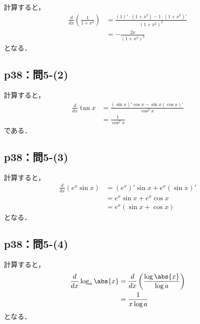 \documentclass[uplatex,dvipdfmx,a4paper,10pt,fleqn]{jsarticle}
\begin{document}
\begin{tleftbar}
    計算すると，
    \begin{align*} 
        \frac{d}{dx} \left ( \frac{1}{1+x^2} \right) & = \frac{(1)' \cdot (1+x^2) - 1 \cdot (1+x^2)'}{(1+x^2)^2} \\
        & = -\frac{2x}{(1+x^2)^2} 
    \end{align*} 
    となる．
\end{tleftbar}


\subsection*{p38：問5-(2)}

\begin{tleftbar}
    計算すると，
    \begin{align*} 
        \frac{d}{dx} \tan x & = \frac{(\sin x)' \cos x - \sin x (\cos x)'}{\cos ^2 x} \\
        & = \frac{1}{\cos ^2 x}
    \end{align*}
        である．
\end{tleftbar}


\subsection*{p38：問5-(3)}

\begin{tleftbar}
    計算すると，
    \begin{align*} 
        \frac{d}{dx} ( e^x \sin x) & = (e^x)' \sin  x + e^x (\sin x)' \\
        & = e^x \sin x + e^x \cos x \\
        & = e^x (\sin x + \cos x)
    \end{align*} 
    となる．
\end{tleftbar}


\subsection*{p38：問5-(4)}

\begin{tleftbar}
    計算すると，
    \begin{align*} 
        \frac{d}{dx} \log_a \abs{x} & = \frac{d}{dx} \left ( \frac{\log \abs{x}}{\log a} \right) \\
        & = \frac{1}{x \log a}
    \end{align*}
    となる．
\end{tleftbar}
\end{document}
